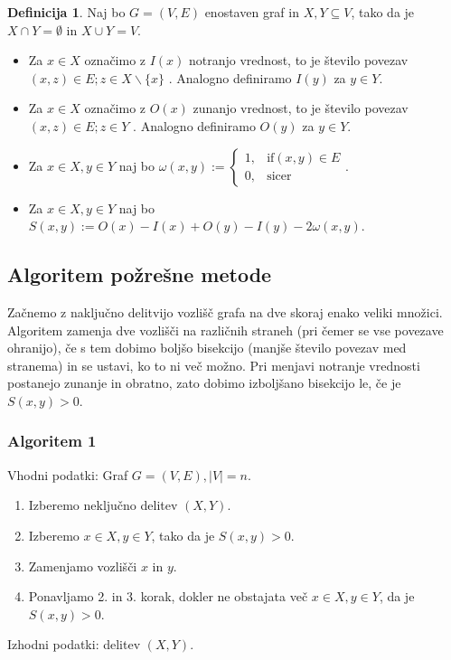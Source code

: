 \documentclass[12pt,a4paper]{amsart}
\theoremstyle{definition} %
\newtheorem{definicija}{Definicija}[section]
\theoremstyle{plain} %
\begin{document}
\begin{definicija}
Naj bo $G=(V,E)$ enostaven graf in $X,Y \subseteq V$, tako da je $X \cap Y = \emptyset$ in $X \cup Y =V$.
\begin{itemize}
\item Za $x \in X$ označimo z $I(x)$ notranjo vrednost, to je število povezav $(x,z) \in E;z\in X \backslash \{x\}$ . Analogno definiramo $I(y)$ za $y \in Y$.
\item Za $x \in X$ označimo z $O(x)$ zunanjo vrednost, to je število povezav $(x,z) \in E;z\in Y $ . Analogno definiramo $O(y)$ za $y \in Y$.
\item Za $x \in X, y \in Y$ naj bo $\omega(x,y) := \begin{cases} 1,&\text{if} (x,y) \in E\\ 
0, &\text{sicer}\end{cases} $.
\item Za $x \in X, y \in Y$ naj bo $S(x,y):= O(x)-I(x)+O(y)-I(y)-2\omega(x,y)$.
\end{itemize}
\end{definicija}

\subsection{Algoritem požrešne metode}
Začnemo z naključno delitvijo vozlišč grafa na dve skoraj enako veliki množici. Algoritem zamenja dve vozlišči na različnih straneh (pri čemer se vse povezave ohranijo), če s tem dobimo boljšo bisekcijo (manjše število povezav med stranema) in se ustavi, ko to ni več možno. Pri menjavi notranje vrednosti postanejo zunanje in obratno, zato dobimo izboljšano bisekcijo le, če je $S(x,y)>0$.
\subsubsection{Algoritem 1} 
Vhodni podatki: Graf $G=(V,E), |V|=n$.
\begin{enumerate}
\item Izberemo neključno delitev $(X,Y)$.
\item Izberemo $x\in X, y\in Y$, tako da je $S(x,y)>0$.
\item Zamenjamo vozlišči $x$ in $y$.
\item Ponavljamo 2. in 3. korak, dokler ne obstajata več $x\in X, y\in Y$, da je $S(x,y)>0$.
\end{enumerate}
Izhodni podatki: delitev $(X,Y)$.
\end{document}
